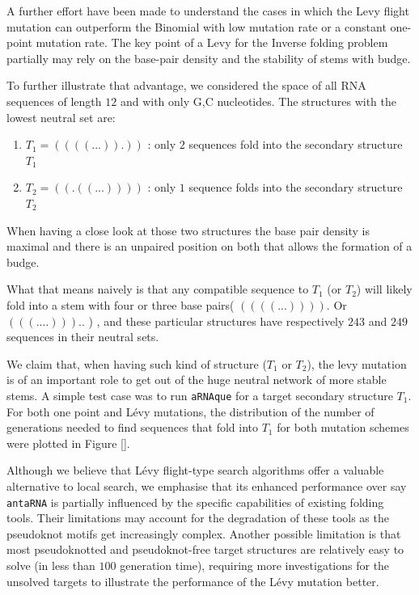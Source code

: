 A further effort have been made to understand the cases in which the Levy flight mutation can outperform the Binomial with low mutation rate or a constant one-point mutation rate.
The key point of a Levy for the Inverse folding problem partially may rely on the base-pair density and the stability of stems with budge.  

To further illustrate that advantage, we considered the space of all RNA sequences of length  $12$ and with only G,C nucleotides. The structures with the lowest neutral set are: 

\begin{enumerate}
	\item $T_1= ((((...)).))$ : only $2$ sequences fold into the secondary structure $T_1$
		\item $T_2= ((.((...))))$ : only $1$ sequence folds into the secondary structure $T_2$
\end{enumerate}

When having a close look at those two structures the base pair density is maximal and there is an unpaired position on both that allows the formation of a budge. 

What that means naively is that any compatible sequence to $T_1$ (or $T_2$) will likely fold into a stem with four or three base pairs( $((((...)))).$ Or $(((....)))..$ ) , and these particular structures have respectively $243$ and $249$ sequences in their neutral sets. 

We claim that, when having such kind of structure ($T_1$ or $T_2$), the levy mutation is of an important role to get out of the huge neutral network of more stable stems. A simple test case was to run \texttt{aRNAque} for a target secondary structure $T_1$.  For both one point and Lévy mutations, the distribution of the number of generations needed to find sequences that fold into $T_1$ for both mutation schemes were plotted in Figure \ref{}. 

Although we believe that Lévy flight-type search algorithms offer a valuable alternative to local search, we emphasise that its enhanced performance over say \texttt{antaRNA} is partially influenced by the specific capabilities of existing folding tools. Their limitations may account for the degradation of these tools as the pseudoknot motifs get increasingly complex. Another possible limitation is that most pseudoknotted and pseudoknot-free target structures are relatively easy to solve (in less than $100$ generation time), requiring more investigations for the unsolved targets to illustrate the performance of the Lévy mutation better.
